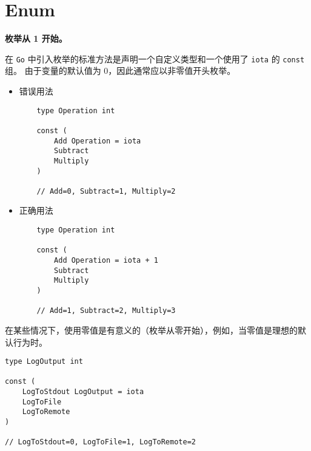 \chapter{Enum}
\textbf{枚举从 1 开始。}

在 \texttt{Go} 中引入枚举的标准方法是声明一个自定义类型和一个使用了 \texttt{iota} 的 \texttt{const} 组。
由于变量的默认值为 0，因此通常应以非零值开头枚举。
\begin{itemize}[leftmargin=4em]
\item 错误用法

  \begin{verbatim}
    type Operation int

    const (
    	Add Operation = iota
    	Subtract
    	Multiply
    )

    // Add=0, Subtract=1, Multiply=2
  \end{verbatim}
\item 正确用法

  \begin{verbatim}
    type Operation int

    const (
    	Add Operation = iota + 1
    	Subtract
    	Multiply
    )

    // Add=1, Subtract=2, Multiply=3
  \end{verbatim}
\end{itemize}

在某些情况下，使用零值是有意义的（枚举从零开始），例如，当零值是理想的默认行为时。
\begin{verbatim}
type LogOutput int

const (
	LogToStdout LogOutput = iota
	LogToFile
	LogToRemote
)

// LogToStdout=0, LogToFile=1, LogToRemote=2
\end{verbatim}
